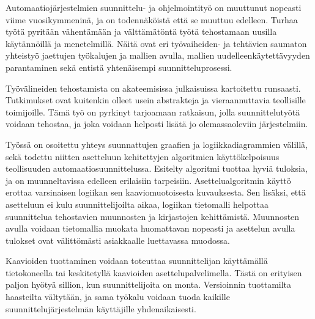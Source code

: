 \documentclass[finnish,12pt]{article}
\begin{document}
Automaatiojärjestelmien suunnittelu- ja ohjelmointityö on muuttunut nopeasti viime vuosikymmeninä, ja on todennäköistä että se muuttuu edelleen.
Turhaa työtä pyritään vähentämään ja välttämätöntä työtä tehostamaan uusilla käytännöillä ja menetelmillä.
Näitä ovat eri työvaiheiden- ja tehtävien saumaton yhteistyö jaettujen työkalujen ja mallien avulla, mallien uudelleenkäytettävyyden parantaminen sekä entistä yhtenäisempi suunnitteluprosessi.

Työvälineiden tehostamista on akateemisissa julkaisuissa kartoitettu runsaasti.
Tutkimukset ovat kuitenkin olleet usein abstrakteja ja vieraannuttavia teollisille toimijoille.
Tämä työ on pyrkinyt tarjoamaan ratkaisun, jolla suunnittelutyötä voidaan tehostaa, ja joka voidaan helposti lisätä jo olemassaoleviin järjestelmiin.

Työssä on osoitettu yhteys suunnattujen graafien ja logiikkadiagrammien välillä, sekä todettu niitten asetteluun kehitettyjen algoritmien käyttökelpoisuus teollisuuden automaatiosuunnittelussa.
Esitelty algoritmi tuottaa hyviä tuloksia, ja on muunneltavissa edelleen erilaisiin tarpeisiin.
Asettelualgoritmin käyttö erottaa varsinaisen logiikan sen kaaviomuotoisesta kuvauksesta.
Sen lisäksi, että asetteluun ei kulu suunnittelijoilta aikaa, logiikan tietomalli helpottaa suunnittelua tehostavien muunnosten ja kirjastojen kehittämistä.
Muunnosten avulla voidaan tietomallia muokata huomattavan nopeasti ja asettelun avulla tulokset ovat välittömästi asiakkaalle luettavassa muodossa.

Kaavioiden tuottaminen voidaan toteuttaa suunnittelijan käyttämällä tietokoneella tai keskitetyllä kaavioiden asettelupalvelimella.
Tästä on erityisen paljon hyötyä sillion, kun suunnittelijoita on monta.
Versioinnin tuottamilta haasteilta vältytään, ja sama työkalu voidaan tuoda kaikille suunnittelujärjestelmän käyttäjille yhdenaikaisesti.

\clearpage
{}


\end{document}
